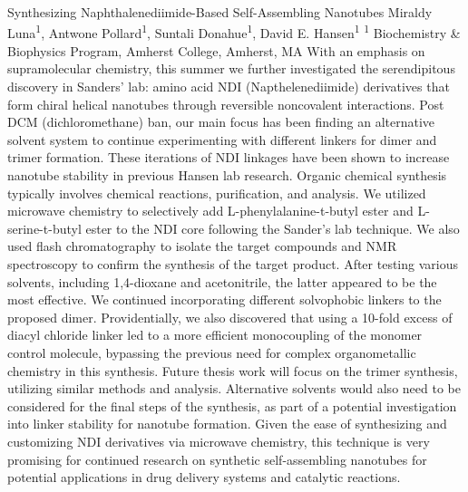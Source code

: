 \makeabstract
    {
    Synthesizing Naphthalenediimide-Based Self-Assembling Nanotubes
    }
    {
    Miraldy Luna\textsuperscript{1}, Antwone Pollard\textsuperscript{1}, Suntali Donahue\textsuperscript{1}, David E. Hansen\textsuperscript{1}
    }
    {
    \textsuperscript{1} Biochemistry \& Biophysics Program, Amherst College, Amherst, MA
    }
    {
    With an emphasis on supramolecular chemistry, this summer we further investigated the serendipitous discovery in Sanders{\textquoteright} lab: amino acid NDI (Napthelenediimide) derivatives that form chiral helical nanotubes through reversible noncovalent interactions. Post DCM (dichloromethane) ban, our main focus has been finding an alternative solvent system to continue experimenting with different linkers for dimer and trimer formation. These iterations of NDI linkages have been shown to increase nanotube stability in previous Hansen lab research.
    }
    {
    Organic chemical synthesis typically involves chemical reactions, purification, and analysis. We utilized microwave chemistry to selectively add L-phenylalanine-t-butyl ester and L-serine-t-butyl ester to the NDI core following the Sander{\textquoteright}s lab technique. We also used flash chromatography to isolate the target compounds and NMR spectroscopy to confirm the synthesis of the target product.
    }
    {
    After testing various solvents, including 1,4-dioxane and acetonitrile, the latter appeared to be the most effective. We continued incorporating different solvophobic linkers to the proposed dimer. Providentially, we also discovered that using a 10-fold excess of diacyl chloride linker led to a more efficient monocoupling of the monomer control molecule, bypassing the previous need for complex organometallic chemistry in this synthesis.
    }
    {
    Future thesis work will focus on the trimer synthesis, utilizing similar methods and analysis. Alternative solvents would also need to be considered for the final steps of the synthesis, as part of a potential investigation into linker stability for nanotube formation. Given the ease of synthesizing and customizing NDI derivatives via microwave chemistry, this technique is very promising for continued research on synthetic self-assembling nanotubes for potential applications in drug delivery systems and catalytic reactions.
    }

    \newpage
    